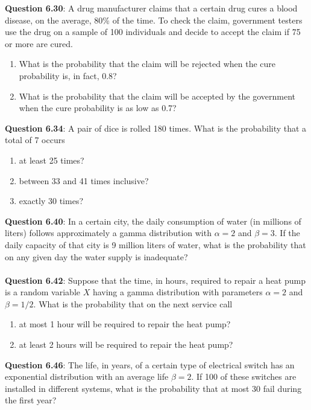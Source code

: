 \documentclass{article}
\begin{document}
    \noindent\textbf{Question 6.30}: A drug manufacturer claims that a certain drug
    cures a blood disease, on the average, 80\% of the time. To check the 
    claim, government testers use the drug on a sample of 100 individuals 
    and decide to accept the claim if 75 or more are cured.
        \begin{enumerate}[label = (\alph*) ]
            \item What is the probability that the claim will be rejected 
            when the cure probability is, in fact, 0.8?
            \item What is the probability that the claim will be accepted 
            by the government when the cure probability is as low as 0.7?
        \end{enumerate}

    \noindent\textbf{Question 6.34}: A pair of dice is rolled 180 times. What is the
    probability that a total of 7 occurs
        \begin{enumerate}[label = (\alph*) ]
            \item at least 25 times?
            \item between 33 and 41 times inclusive?
            \item exactly 30 times?
        \end{enumerate}

    \noindent\textbf{Question 6.40}: In a certain city, the daily consumption of water
    (in millions of liters) follows approximately a gamma distribution with 
    $\alpha = 2$ and $\beta = 3$. If the daily capacity of that city is 9 
    million liters of water, what is the probability that on any given day 
    the water supply is inadequate?\\\\

    \noindent\textbf{Question 6.42}: Suppose that the time, in hours, required to
    repair a heat pump is a random variable $X$ having a gamma distribution 
    with parameters $\alpha = 2$ and $\beta = 1/2$. What is the probability 
    that on the next service call
        \begin{enumerate}[label = (\alph*) ]
            \item at most 1 hour will be required to repair the heat pump?
            \item at least 2 hours will be required to repair the heat pump?
        \end{enumerate}

    \noindent\textbf{Question 6.46}: The life, in years, of a certain type of electrical
    switch has an exponential distribution with an average life $\beta = 2$. If 100 of 
    these switches are installed in different systems, what is the probability that at 
    most 30 fail during the first year?\\\\
    
\end{document}
